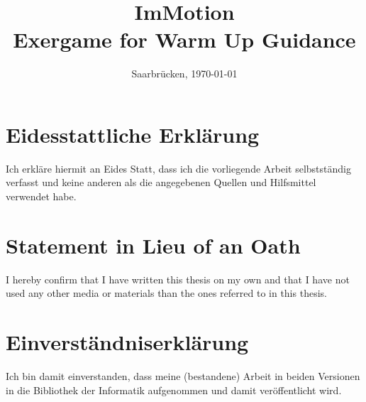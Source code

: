 \documentclass[11pt, a4paper, twoside]{Thesis}
\date{\displaydate{date1}}
\date{\displaydate{date2}}
\begin{document}




\frontmatter

\title  {ImMotion\\ Exergame for Warm Up Guidance}

\addresses  {\groupname\\\deptname\\\univname}  %
\date       {Saarbr\"ucken, \today }
\subject    {}
\keywords   {}

\maketitle



\thispagestyle{empty}
\setcounter{tocdepth}{5}
\section*{Eidesstattliche Erkl\"{a}rung}
Ich erkl\"{a}re hiermit an Eides Statt, dass ich die vorliegende Arbeit selbstst\"{a}ndig verfasst und keine
anderen als die angegebenen Quellen und Hilfsmittel verwendet habe.

\vspace{0.60cm}
\section*{Statement in Lieu of an Oath}
I hereby confirm that I have written this thesis on my own and that I have not used any other media or
materials than the ones referred to in this thesis.
\vspace{1.5cm}

\section*{Einverst\"{a}ndniserkl\"{a}rung}
Ich bin damit einverstanden, dass meine (bestandene) Arbeit in beiden Versionen in die Bibliothek der
Informatik aufgenommen und damit ver\"{o}ffentlicht wird.

\vspace{0.60cm}
\end{document}
